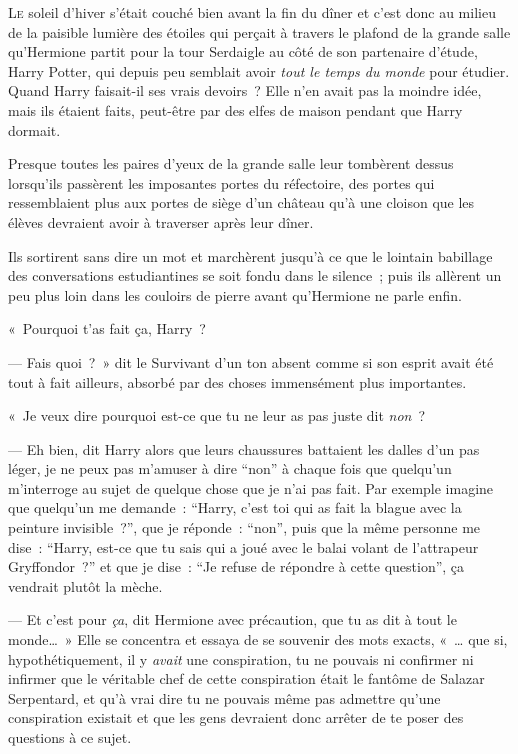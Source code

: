
\lettrine{L}{e} soleil d'hiver s'était couché bien avant la fin du dîner et c'est donc au milieu de la paisible lumière des étoiles qui perçait à travers le plafond de la grande salle qu'Hermione partit pour la tour Serdaigle au côté de son partenaire d'étude, Harry Potter, qui depuis peu semblait avoir \emph{tout le temps du monde} pour étudier.
Quand Harry faisait-il ses vrais devoirs~?
Elle n'en avait pas la moindre idée, mais ils étaient faits, peut-être par des elfes de maison pendant que Harry dormait.

Presque toutes les paires d'yeux de la grande salle leur tombèrent dessus lorsqu'ils passèrent les imposantes portes du réfectoire, des portes qui ressemblaient plus aux portes de siège d'un château qu'à une cloison que les élèves devraient avoir à traverser après leur dîner.

Ils sortirent sans dire un mot et marchèrent jusqu'à ce que le lointain babillage des conversations estudiantines se soit fondu dans le silence~; puis ils allèrent un peu plus loin dans les couloirs de pierre avant qu'Hermione ne parle enfin.

«~Pourquoi t'as fait ça, Harry~?

--- Fais quoi~?~»
dit le Survivant d'un ton absent comme si son esprit avait été tout à fait ailleurs, absorbé par des choses immensément plus importantes.

«~Je veux dire pourquoi est-ce que tu ne leur as pas juste dit \emph{non}~?

--- Eh bien, dit Harry alors que leurs chaussures battaient les dalles d'un pas léger, je ne peux pas m'amuser à dire “non” à chaque fois que quelqu'un m'interroge au sujet de quelque chose que je n'ai pas fait.
Par exemple imagine que quelqu'un me demande~: “Harry, c'est toi qui as fait la blague avec la peinture invisible~?”, que je réponde~: “non”, puis que la même personne me dise~: “Harry, est-ce que tu sais qui a joué avec le balai volant de l'attrapeur Gryffondor~?” et que je dise~: “Je refuse de répondre à cette question”, ça vendrait plutôt la mèche.

--- Et c'est pour \emph{ça}, dit Hermione avec précaution, que tu as dit à tout le monde…~»
Elle se concentra et essaya de se souvenir des mots exacts, «~… que si, hypothétiquement, il y \emph{avait} une conspiration, tu ne pouvais ni confirmer ni infirmer que le véritable chef de cette conspiration était le fantôme de Salazar Serpentard, et qu'à vrai dire tu ne pouvais même pas admettre qu'une conspiration existait et que les gens devraient donc arrêter de te poser des questions à ce sujet.

